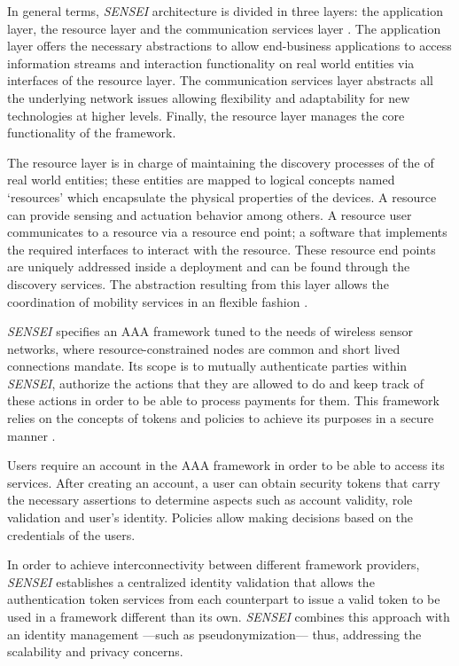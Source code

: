 \documentclass[journal]{IEEEtran}
\begin{document}
  In general terms, \emph{SENSEI} architecture is divided in three layers: the application layer, the resource layer and the communication services layer \cite{Tsiatsis2010}. The application layer offers the necessary abstractions to allow end-business applications to access information streams and interaction functionality on real world entities via interfaces of the resource layer. The communication services layer abstracts all the underlying network issues allowing flexibility and adaptability for new technologies at higher levels. Finally, the resource layer manages the core functionality of the framework. 

  The resource layer is in charge of maintaining the discovery processes of the of real world entities; these entities are mapped to logical concepts named `resources' which encapsulate the physical properties of the devices. A resource can provide sensing and actuation behavior among others. A resource user communicates to a resource via a resource end point; a software that implements the required interfaces to interact with the resource. These resource end points are uniquely addressed inside a deployment and can be found through the discovery services. The abstraction resulting from this layer allows the coordination of mobility services in an flexible fashion \cite{Tsiatsis2010}. 
  
  \emph{SENSEI} specifies an AAA framework tuned to the needs of wireless sensor networks, where resource-constrained nodes are common and short lived connections mandate. Its scope is to mutually authenticate parties within \emph{SENSEI}, authorize the actions that they are allowed to do and keep track of these actions in order to be able to process payments for them. This framework relies on the concepts of tokens and policies to achieve its purposes in a secure manner \cite{Bauge2010}.

  Users require an account in the AAA framework in order to be able to access its services. After creating an account, a user can obtain security tokens that carry the necessary assertions to determine aspects such as account validity, role validation and user's identity. Policies allow making decisions based on the credentials of the users.

  In order to achieve interconnectivity between different framework providers, \emph{SENSEI} establishes a centralized identity validation that allows the authentication token services from each counterpart to issue a valid token to be used in a framework different than its own. \emph{SENSEI} combines this approach with an identity management ---such as pseudonymization--- thus, addressing the scalability and privacy concerns. 
\end{document}
